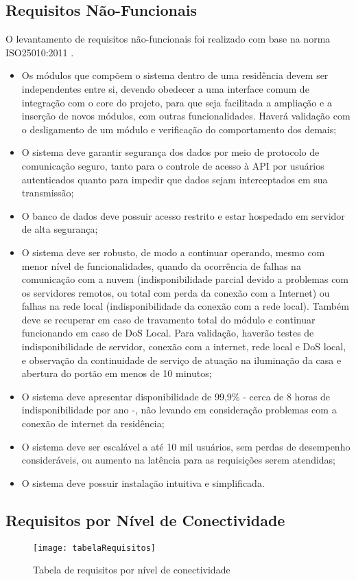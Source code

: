 \subsection{Requisitos Não-Funcionais}
O levantamento de requisitos não-funcionais foi realizado com base na norma ISO25010:2011 \cite{iso25010}.

\begin{itemize}
\item Os módulos que compõem o sistema dentro de uma residência devem ser independentes entre si, devendo obedecer a uma interface comum de integração com o core do projeto, para que seja facilitada a ampliação e a inserção de novos módulos, com outras funcionalidades. Haverá validação com o desligamento de um módulo e verificação do comportamento dos demais;
\item O sistema deve garantir segurança dos dados por meio de protocolo de comunicação seguro, tanto para o controle de acesso à API por usuários autenticados quanto para impedir que dados sejam interceptados em sua transmissão;
\item O banco de dados deve possuir acesso restrito e estar hospedado em servidor de alta segurança;
\item O sistema deve ser robusto, de modo a continuar operando, mesmo com menor nível de funcionalidades, quando da ocorrência de falhas na comunicação com a nuvem (indisponibilidade parcial devido a problemas com os servidores remotos, ou total com perda da conexão com a Internet) ou falhas na rede local (indisponibilidade da conexão com a rede local). Também deve se recuperar em caso de travamento total do módulo e continuar funcionando em caso de DoS Local. Para validação, haverão testes de indisponibilidade de servidor, conexão com a internet, rede local e DoS local, e observação da continuidade de serviço de atuação na iluminação da casa e abertura do portão em menos de 10 minutos;
\item O sistema deve apresentar disponibilidade de 99,9\% - cerca de 8 horas de indisponibilidade por ano -, não levando em consideração problemas com a conexão de internet da residência;
\item O sistema deve ser escalável a até 10 mil usuários, sem perdas de desempenho consideráveis, ou aumento na latência para as requisições serem atendidas;
\item O sistema deve possuir instalação intuitiva e simplificada.
\end{itemize}

\subsection{Requisitos por Nível de Conectividade}

\begin{figure}[H]
	\centering
	\caption{Tabela de requisitos por nível de conectividade}
  \texttt{[image: tabelaRequisitos]}
\label{fig:tabelaRequisitos}
\end{figure}
